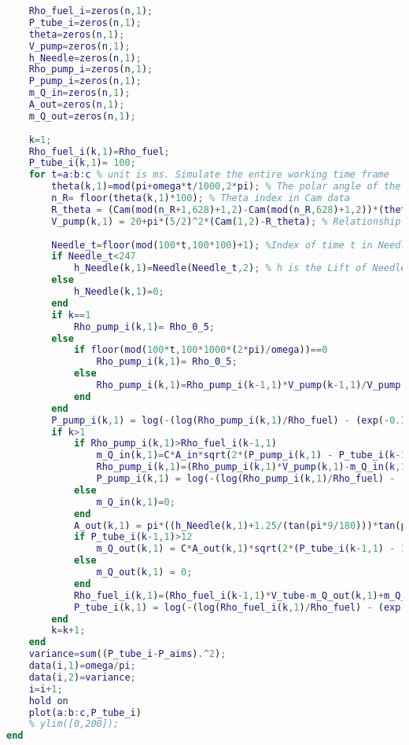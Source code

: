 \documentclass[withoutpreface,bwprint]{cumcmthesis} %
\begin{document}
\begin{appendices}
\begin{lstlisting}[language=matlab]
    % Allocate memory
    Rho_fuel_i=zeros(n,1);
    P_tube_i=zeros(n,1);
    theta=zeros(n,1);
    V_pump=zeros(n,1);
    h_Needle=zeros(n,1);
    Rho_pump_i=zeros(n,1);
    P_pump_i=zeros(n,1);
    m_Q_in=zeros(n,1);
    A_out=zeros(n,1);
    m_Q_out=zeros(n,1);
    
    k=1;
    Rho_fuel_i(k,1)=Rho_fuel;
    P_tube_i(k,1)= 100;
    for t=a:b:c % unit is ms. Simulate the entire working time frame
        theta(k,1)=mod(pi+omega*t/1000,2*pi); % The polar angle of the current moment cam. (unit is rad)
        n_R= floor(theta(k,1)*100); % Theta index in Cam data
        R_theta = (Cam(mod(n_R+1,628)+1,2)-Cam(mod(n_R,628)+1,2))*(theta(k,1)*100-n_R)+Cam(mod(n_R,628)+1,2) ; % The diameter of the current moment cam. (unit is mm)
        V_pump(k,1) = 20+pi*(5/2)^2*(Cam(1,2)-R_theta); % Relationship between oil pump volume and pole diameter.
        
        Needle_t=floor(mod(100*t,100*100)+1); %Index of time t in Needle data
        if Needle_t<247
            h_Needle(k,1)=Needle(Needle_t,2); % h is the Lift of Needle.
        else
            h_Needle(k,1)=0;
        end
        if k==1
            Rho_pump_i(k,1)= Rho_0_5; 
        else
            if floor(mod(100*t,100*1000*(2*pi)/omega))==0
                Rho_pump_i(k,1)= Rho_0_5;
            else
                Rho_pump_i(k,1)=Rho_pump_i(k-1,1)*V_pump(k-1,1)/V_pump(k,1); % Fuel density in the oil pump at the current time.
            end
        end
        P_pump_i(k,1) = log(-(log(Rho_pump_i(k,1)/Rho_fuel) - (exp(-0.39)/(0.0039*exp(7.31))))*0.0039*exp(7.31))*(-1/0.0039);
        if k>1 
            if Rho_pump_i(k,1)>Rho_fuel_i(k-1,1) 
                m_Q_in(k,1)=C*A_in*sqrt(2*(P_pump_i(k,1) - P_tube_i(k-1,1))*Rho_pump_i(k,1))*b;
                Rho_pump_i(k,1)=(Rho_pump_i(k,1)*V_pump(k,1)-m_Q_in(k,1))/V_pump(k,1);
                P_pump_i(k,1) = log(-(log(Rho_pump_i(k,1)/Rho_fuel) - (exp(-0.39)/(0.0039*exp(7.31))))*0.0039*exp(7.31))*(-1/0.0039);
            else
                m_Q_in(k,1)=0;
            end
            A_out(k,1) = pi*((h_Needle(k,1)+1.25/(tan(pi*9/180)))*tan(pi*9/180))^2-pi*1.25^2;
            if P_tube_i(k-1,1)>12 
                m_Q_out(k,1) = C*A_out(k,1)*sqrt(2*(P_tube_i(k-1,1) - 12)*Rho_fuel_i(k-1,1))*b;
            else
                m_Q_out(k,1) = 0;
            end
            Rho_fuel_i(k,1)=(Rho_fuel_i(k-1,1)*V_tube-m_Q_out(k,1)+m_Q_in(k,1))/V_tube;
            P_tube_i(k,1) = log(-(log(Rho_fuel_i(k,1)/Rho_fuel) - (exp(-0.39)/(0.0039*exp(7.31))))*0.0039*exp(7.31))*(-1/0.0039);
        end
        k=k+1;
    end
    variance=sum((P_tube_i-P_aims).^2);
    data(i,1)=omega/pi;
    data(i,2)=variance;
    i=i+1;
    hold on
    plot(a:b:c,P_tube_i)
    % ylim([0,200]);
end


\end{lstlisting}
\end{appendices}
\end{document}
